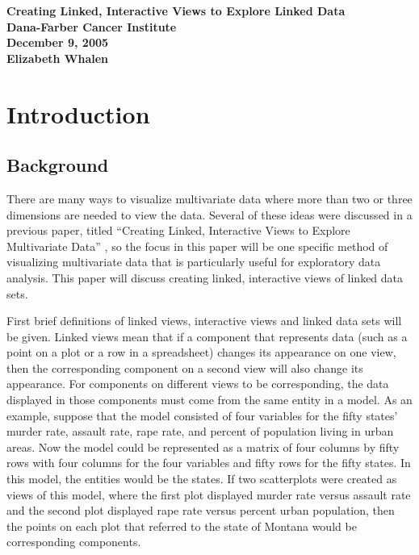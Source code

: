 \documentclass{article}[11pt]
\begin{document}



\begin{titlepage}
\begin{center}
\Large
\vspace*{1in}
\textbf{Creating Linked, Interactive Views to \linebreak Explore Linked Data} \\
\vspace{1in}
\textbf{Dana-Farber Cancer Institute}\\ 
\textbf{December 9, 2005} \\
\vspace{1in} 
\textbf{Elizabeth Whalen} \\
\end{center}
\end{titlepage}
\normalsize
\newpage

\section{Introduction}\label{Sec:Intro}

\subsection{Background}\label{Ssec:Backg}

There are many ways to visualize multivariate data where more than
two or three dimensions are needed to view the data.  Several of these ideas
were discussed in a previous paper, titled ``Creating Linked, Interactive
Views to Explore Multivariate Data'' \cite{EW05}, so the focus in this paper
will be one specific method of visualizing multivariate data that is
particularly useful for exploratory data analysis.  This paper will discuss
creating linked, interactive views of linked data sets.  

First brief definitions of linked views, interactive views and linked data
sets will be given.  Linked views mean that if a component that represents
data (such as a point on a plot or a row in a spreadsheet) changes its
appearance on one view, then the corresponding component on a second view will
also change its appearance.  For components on different views to be
corresponding, the data displayed in those components must come from the same
entity in a model.  As an example, suppose that the model consisted of four
variables for the fifty states' murder rate, assault rate, rape rate, and
percent of population living in urban areas.  Now the model could be
represented as a matrix of four columns by fifty rows with four columns for
the four variables and fifty rows for the fifty states.  In this model, the
entities would be the states.  If two scatterplots were created as views of
this model, where the first plot displayed murder rate versus assault rate and
the second plot displayed rape rate versus percent urban population, then the
points on each plot that referred to the state of Montana would be
corresponding components.
\end{document}
